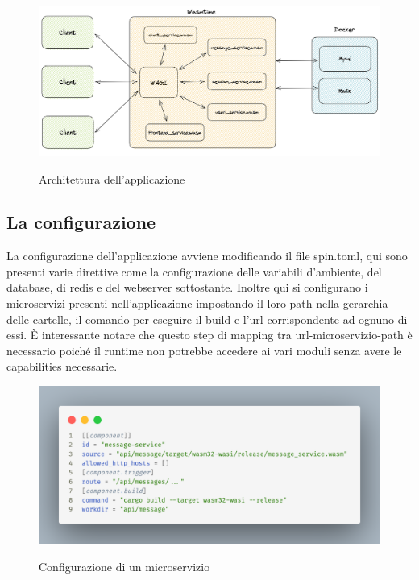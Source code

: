 \begin{figure}[h]
    \centering
    \captionsetup{justification=centering}
    \includegraphics[width=15cm]{./chapters/3.poc/images/0.poc-architecture.png}
    \label{fig:0.poc-architecture}
    \caption{Architettura dell'applicazione}
\end{figure}

\subsection{La configurazione}
La configurazione dell'applicazione avviene modificando il file spin.toml, qui sono presenti varie direttive come la
configurazione delle variabili d'ambiente, del database, di redis e del webserver sottostante. Inoltre qui si
configurano i microservizi presenti nell'applicazione impostando il loro path nella gerarchia delle cartelle, il comando
per eseguire il build e l'url corrispondente ad ognuno di essi. È interessante notare che questo step di mapping tra
url-microservizio-path è necessario poiché il runtime non potrebbe accedere ai vari moduli senza avere le capabilities
necessarie.

\begin{figure}[h]
    \centering
    \captionsetup{justification=centering}
    \includegraphics[width=15cm]{./chapters/3.poc/images/1.spintoml.png}
    \label{fig:1.app-configuration}
    \caption{Configurazione di un microservizio}
\end{figure}

